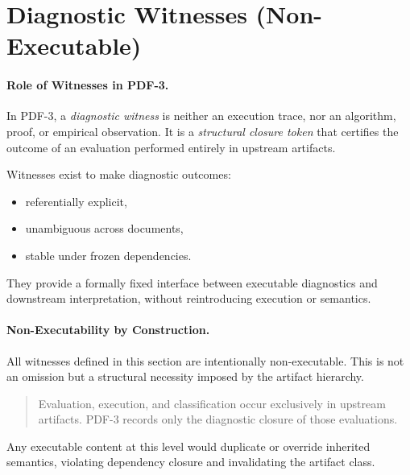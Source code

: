 ﻿%

\section{Diagnostic Witnesses (Non-Executable)}

\paragraph{Role of Witnesses in PDF-3.}
In PDF-3, a \emph{diagnostic witness} is neither an execution trace,
nor an algorithm, proof, or empirical observation.
It is a \emph{structural closure token} that certifies the outcome
of an evaluation performed entirely in upstream artifacts.

Witnesses exist to make diagnostic outcomes:
\begin{itemize}
  \item referentially explicit,
  \item unambiguous across documents,
  \item stable under frozen dependencies.
\end{itemize}

They provide a formally fixed interface between executable diagnostics
and downstream interpretation, without reintroducing execution or semantics.

\paragraph{Non-Executability by Construction.}
All witnesses defined in this section are intentionally non-executable.
This is not an omission but a structural necessity imposed by the artifact hierarchy.

\begin{quote}
Evaluation, execution, and classification occur exclusively in upstream artifacts.
PDF-3 records only the diagnostic closure of those evaluations.
\end{quote}

Any executable content at this level would duplicate or override inherited semantics,
violating dependency closure and invalidating the artifact class.

